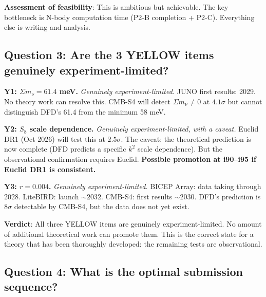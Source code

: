 \documentclass[11pt,a4paper]{article}
\begin{document}
\textbf{Assessment of feasibility}: This is ambitious but achievable. The key bottleneck is N-body computation time (P2-B completion + P2-C). Everything else is writing and analysis.

\subsection{Question 3: Are the 3 YELLOW items genuinely experiment-limited?}

\textbf{Y1: $\Sigma m_\nu = 61.4$ meV.} \emph{Genuinely experiment-limited.} JUNO first results: 2029. No theory work can resolve this. CMB-S4 will detect $\Sigma m_\nu \neq 0$ at $4.1\sigma$ but cannot distinguish DFD's 61.4 from the minimum 58 meV.

\textbf{Y2: $S_8$ scale dependence.} \emph{Genuinely experiment-limited, with a caveat.} Euclid DR1 (Oct 2026) will test this at $2.5\sigma$. The caveat: the theoretical prediction is now complete (DFD predicts a specific $k^2$ scale dependence). But the observational confirmation requires Euclid. \textbf{Possible promotion at i90--i95 if Euclid DR1 is consistent.}

\textbf{Y3: $r = 0.004$.} \emph{Genuinely experiment-limited.} BICEP Array: data taking through 2028. LiteBIRD: launch $\sim 2032$. CMB-S4: first results $\sim 2030$. DFD's prediction is $8\sigma$ detectable by CMB-S4, but the data does not yet exist.

\textbf{Verdict}: All three YELLOW items are genuinely experiment-limited. No amount of additional theoretical work can promote them. This is the correct state for a theory that has been thoroughly developed: the remaining tests are observational.

\subsection{Question 4: What is the optimal submission sequence?}
\end{document}
